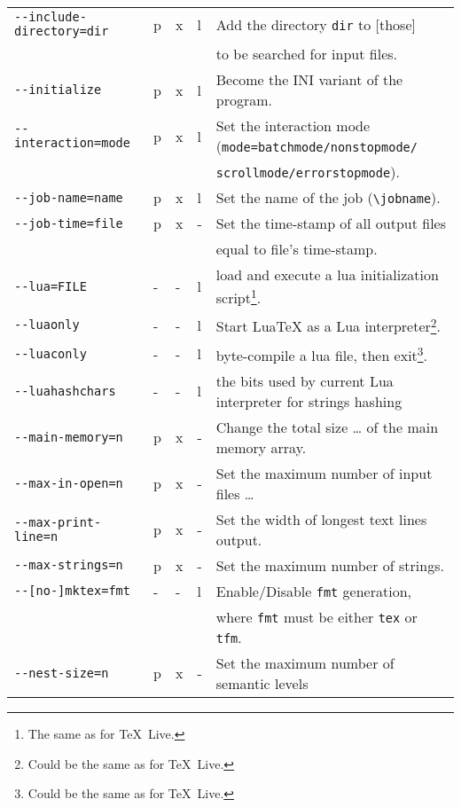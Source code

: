 \documentclass[a4paper, english]{article}%
\newcommand{\texlive}{\TeX~Live}
\begin{document}
{\begin{longtable}{|lllll|}
\texttt{-{}-include-directory=dir}    & p&x&l       & Add the directory \texttt{dir} to [those] \\
                                      &  & &        & to be searched for input files. \\
\texttt{-{}-initialize}               & p&x&l       & Become the INI variant of the program. \\
\texttt{-{}-interaction=mode}         & p&x&l       & Set the interaction mode (\texttt{mode=batchmode/nonstopmode/}\\
&& && \texttt{scrollmode/errorstopmode}). \\
\texttt{-{}-job-name=name}            & p&x&l       & Set the name of the job (\texttt{\textbackslash{}jobname}). \\
\texttt{-{}-job-time=file}            & p&x&- & Set the time-stamp of all output files \\
                                      &  & &        & equal to file's time-stamp. \\
\texttt{-{}-lua=FILE}                 & -&-&l & load and execute a lua initialization script\footnote%
   {The same as for \texlive. }.   \\
\texttt{-{}-luaonly}                  & -&-&l & Start LuaTeX as a Lua interpreter\footnote%
   {Could be the same as for \texlive. }.  \\
\texttt{-{}-luaconly}                 & -&-&l & byte-compile a lua file, then exit\footnote%
   {Could be the same as for \texlive. }. \\
\texttt{-{}-luahashchars}             & -&-&l & the bits used by current Lua interpreter for strings hashing \\
\texttt{-{}-main-memory=n}            & p&x&- & Change the total size \dots{} of the main memory array. \\
\texttt{-{}-max-in-open=n}            & p&x&- & Set the maximum number of input files \dots \\
\texttt{-{}-max-print-line=n}         & p&x&- & Set the width of longest text lines output. \\
\texttt{-{}-max-strings=n}            & p&x&- & Set the maximum number of strings. \\
\texttt{-{}-[no-]mktex=fmt}           & -&-&l & Enable/Disable \texttt{fmt} generation, \\
                                      &  & &  & where \texttt{fmt} must be either \texttt{tex} or \texttt{tfm}. \\
\texttt{-{}-nest-size=n}              & p&x&- & Set the maximum number of semantic levels \\

\end{longtable}}
\end{document}
